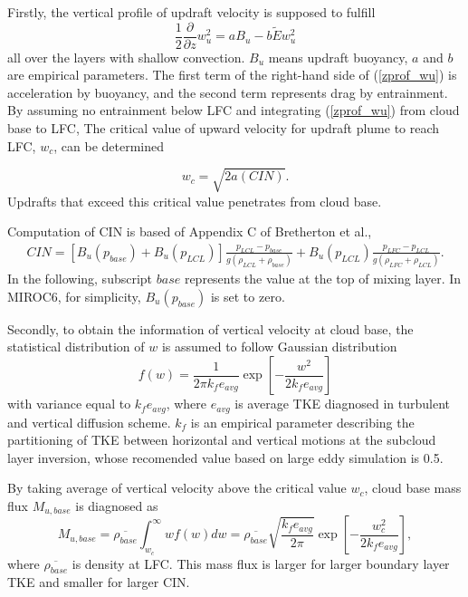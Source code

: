 \documentclass[platex, dvipdfmx]{article}
\begin{document}
Firstly, the vertical profile of updraft velocity is supposed to fulfill 
\begin{equation}\label{zprof_wu}
    \frac{1}{2}\frac{\partial}{\partial z}w_u^2=aB_u-b\tilde{E} w_u^2
\end{equation}
all over the layers with shallow convection. $B_u$ means updraft buoyancy, $a$ and $b$ are empirical parameters. 
The first term of the right-hand side of (\ref{zprof_wu}) is acceleration by buoyancy, and the second term represents drag by entrainment.
By assuming no entrainment below LFC and integrating (\ref{zprof_wu}) from cloud base to LFC, The critical value of upward velocity for updraft plume to reach LFC, $w_c$, can be determined

\begin{equation}\label{wc}
    w_c = \sqrt{2a(CIN)}.
\end{equation}
Updrafts that exceed this critical value penetrates from cloud base.

Computation of CIN is based of Appendix C of Bretherton et al., 
\begin{align}\label{def_CIN}
    CIN = [B_u(p_{base}) + B_u(p_{LCL})]\frac{p_{LCL}-p_{base}}{g(\rho_{LCL}+\rho_{base})} + B_u(p_{LCL})\frac{p_{LFC}-p_{LCL}}{g(\rho_{LFC}+\rho_{LCL})}.
\end{align}
In the following, subscript $\mathit{base}$ represents the value at the top of mixing layer. 
In MIROC6, for simplicity, $B_u(p_{base})$ is set to zero.

Secondly, to obtain the information of vertical velocity at cloud base, the statistical distribution of $w$ is assumed to follow Gaussian distribution
\begin{equation}\label{distr_w}
    f(w) = \frac{1}{2\pi k_f e_{avg}}\exp\left[ -\frac{w^2}{2k_fe_{avg}}\right]
\end{equation}
with variance equal to $k_f e_{avg}$, where $e_{avg}$ is average TKE diagnosed in turbulent and vertical diffusion scheme.
$k_f$ is an empirical parameter describing the partitioning of TKE between horizontal and vertical motions at the subcloud layer inversion, whose recomended value based on large eddy simulation is 0.5.

By taking average of vertical velocity above the critical value $w_c$, cloud base mass flux $M_{u,base}$ is diagnosed as
\begin{equation}\label{Mubase}
    M_{u,base}=\overline{\rho_{base}}\int_{w_c}^{\infty}wf(w)dw =\overline{\rho_{base}}\sqrt{\frac{k_f e_{avg}}{2\pi}}\exp\left[-\frac{w_c^2}{2k_fe_{avg}}\right],
\end{equation}
where $\overline{\rho_{base}}$ is density at LFC.
This mass flux is larger for larger boundary layer TKE and smaller for larger CIN.
\end{document}

